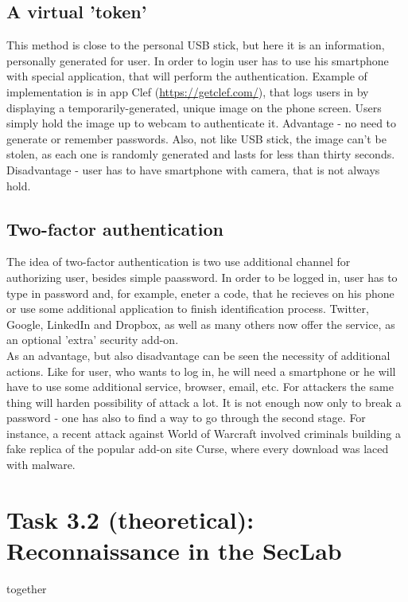 \documentclass{article}
\begin{document}
\subsection*{ A virtual 'token' }
\cite{altern} This method is close to the personal USB stick, but here it is an information, personally generated for user. In order to login user has to use his smartphone with special application, that will perform the authentication. Example of implementation is in app Clef (\url{https://getclef.com/}), that logs users in by displaying a temporarily-generated, unique image on the phone screen. Users simply hold the image up to webcam to authenticate it. Advantage - no need to generate or remember passwords. Also, not like USB stick, the image can't be stolen, as each one is randomly generated and lasts for less than thirty seconds. Disadvantage - user has to have smartphone with camera, that is not always hold.

\subsection*{ Two-factor authentication }
The idea of two-factor authentication is two use additional channel for authorizing user, besides simple paassword. In order to be logged in, user has to type in password and, for example, eneter a code, that he recieves on his phone or use some additional application to finish identification process. Twitter, Google, LinkedIn and Dropbox, as well as many others now offer the service, as an optional 'extra' security add-on. 
\\
As an advantage, but also disadvantage can be seen the necessity of additional actions. Like for user, who wants to log in, he will need a smartphone or he will have to use some additional service, browser, email, etc. For attackers the same thing will harden possibility of attack a lot. It is not enough now only to break a password - one has also to find a way to go through the second stage. For instance, a recent attack against World of Warcraft involved criminals building a fake replica of the popular add-on site Curse, where every download was laced with malware. \cite{twofact}

\section*{Task 3.2 (theoretical): Reconnaissance in the SecLab}
together
\end{document}

